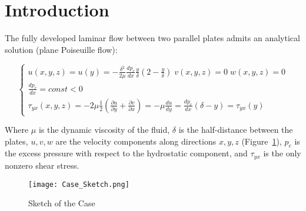 \documentclass[12pt]{article}
\begin{document}
\maketitle

\begin{abstract} 
        The first test case is the steady-state development of incompressible flow between two parallel plates in the laminar regime (Figure~\\\ref{fig:sketch}). The plates are considered infinite in the direction transversal to the flow. The flow develops from a condition of uniform velocity (rectangular profile) imposed at the inlet boundary, reaching a fully-developed state at a certain distance downstream of it. \cite{FL:01}
\end{abstract}

\section{Introduction}
        The fully developed laminar flow between two parallel plates admits an analytical solution (plane Poiseuille flow):

        \begin{equation} \label{eq:system}
                \begin{cases}
                        u(x,y,z) = u(y) = - \frac{\delta ^ 2}{2 \mu} \frac{dp_e}{dx} \frac{y}{\delta} (2 - \frac{y}{\delta}) \; v(x,y,z) = 0 \; w(x,y,z) = 0 \\
                        \frac{dp_e}{dx} = const < 0 \\
                        \tau_{yx}(x,y,z) = - 2 \mu \frac{1}{2} \left( \frac{\partial u}{\partial y} + \frac{\partial v}{\partial x} \right) = - \mu \frac{du}{dy} = \frac{dp_e}{dx} (\delta - y) = \tau_{yx}(y)
                \end{cases}
        \end{equation}

        Where \( \mu \) is the dynamic viscosity of the fluid, \( \delta \) is the half-distance between the plates, \(u, v, w\) are the velocity components along directions \( x, y, z \) (Figure~\ref{fig:sketch}), \( p_e \) is the excess pressure with respect to the hydrostatic component, and \( \tau_{yx} \) is the only nonzero shear stress. \cite{FL:01}

        \begin{figure}[!ht]
                \texttt{[image: Case\_Sketch.png]}
                \centering
                \caption{Sketch of the Case}
                \label{fig:sketch}
        \end{figure}
\end{document}
